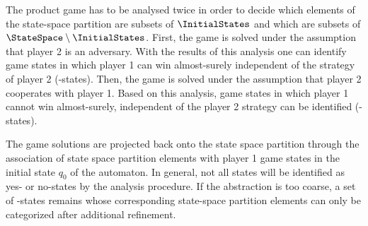 The product game has to be analysed twice in order to decide which elements of the state-space partition are subsets of $\InitialStates$ and which are subsets of $\StateSpace \setminus \InitialStates$.
First, the game is solved under the assumption that player 2 is an adversary.
With the results of this analysis one can identify game states in which player 1 can win almost-surely independent of the strategy of player 2 (-states).
Then, the game is solved under the assumption that player 2 cooperates with player 1.
Based on this analysis, game states in which player 1 cannot win almost-surely, independent of the player 2 strategy can be identified (-states).

The game solutions are projected back onto the state space partition  through the association of state space partition elements with player 1 game states in the initial state $q_0$ of the automaton.
In general, not all states will be identified as yes- or no-states by the analysis procedure.
If the abstraction is too coarse, a set of -states remains whose corresponding state-space partition elements can only be categorized after additional refinement.


    \startalgorithmic[numbering=no,margin=0em]
    \stopalgorithmic
    \startalgorithmic
        \DO
            \DO
                \DO
    \stopalgorithmic
\stopbuffer

